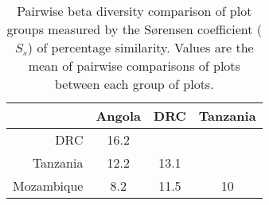
\begin{table}[!htbp] \centering 
  \caption{Pairwise beta diversity comparison of plot groups measured by the S\o{}rensen coefficient ($S_s$) of percentage similarity. Values are the mean of pairwise comparisons of plots between each group of plots.} 
  \label{bicuar:pairs_js} 
\begin{tabular}{rccc} 
\hline
 & Angola & DRC & Tanzania \\ 
\hline
DRC & 16.2 &  &  \\ 
Tanzania & 12.2 & 13.1 &  \\ 
Mozambique & 8.2 & 11.5 & 10 \\ 
\hline
\end{tabular} 
\end{table} 
